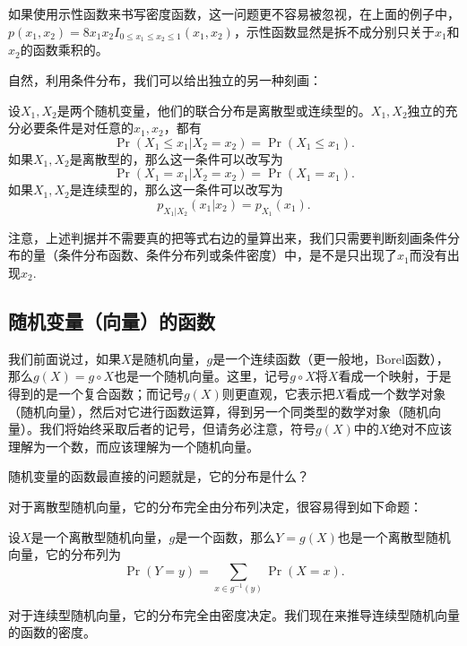 如果使用示性函数来书写密度函数，这一问题更不容易被忽视，在上面的例子中，$p(x_1,x_2)=8x_1x_2I_{0\leq x_1\leq x_2\leq 1}(x_1,x_2)$，示性函数显然是拆不成分别只关于$x_1$和$x_2$的函数乘积的。

自然，利用条件分布，我们可以给出独立的另一种刻画：

\begin{proposition}\label{prop:independence-conditional}
设$X_1,X_2$是两个随机变量，他们的联合分布是离散型或连续型的。$X_1,X_2$独立的充分必要条件是对任意的$x_1,x_2$，都有
\[\Pr(X_1\leq x_1|X_2=x_2)=\Pr(X_1\leq x_1).\]
如果$X_1,X_2$是离散型的，那么这一条件可以改写为
\[\Pr(X_1=x_1|X_2=x_2)=\Pr(X_1=x_1).\]
如果$X_1,X_2$是连续型的，那么这一条件可以改写为
\[p_{X_1|X_2}(x_1|x_2)=p_{X_1}(x_1).\]
\end{proposition}
注意，上述判据并不需要真的把等式右边的量算出来，我们只需要判断刻画条件分布的量（条件分布函数、条件分布列或条件密度）中，是不是只出现了$x_1$而没有出现$x_2$. 

\subsection{随机变量（向量）的函数}

我们前面说过，如果$X$是随机向量，$g$是一个连续函数（更一般地，Borel函数），那么$g(X)=g\circ X$也是一个随机向量。这里，记号$g\circ X$将$X$看成一个映射，于是得到的是一个复合函数；而记号$g(X)$则更直观，它表示把$X$看成一个数学对象（随机向量），然后对它进行函数运算，得到另一个同类型的数学对象（随机向量）。我们将始终采取后者的记号，但请务必注意，符号$g(X)$中的$X$绝对不应该理解为一个数，而应该理解为一个随机向量。

随机变量的函数最直接的问题就是，它的分布是什么？

对于离散型随机向量，它的分布完全由分布列决定，很容易得到如下命题：

\begin{proposition}\label{prop:discrete-function}
设$X$是一个离散型随机向量，$g$是一个函数，那么$Y=g(X)$也是一个离散型随机向量，它的分布列为
\[\Pr(Y=y)=\sum_{x\in g^{-1}(y)}\Pr(X=x).\]
\end{proposition}

对于连续型随机向量，它的分布完全由密度决定。我们现在来推导连续型随机向量的函数的密度。

